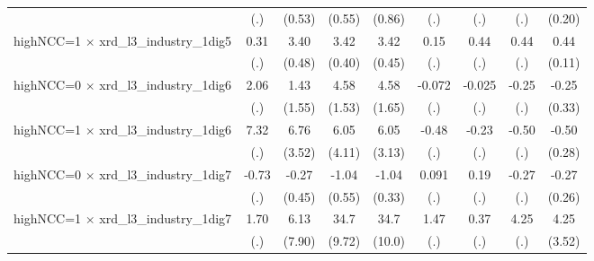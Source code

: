 {\begin{tabular}{l*{8}{c}}
                    &         (.)         &      (0.53)         &      (0.55)         &      (0.86)         &         (.)         &         (.)         &         (.)         &      (0.20)         \\
\addlinespace
highNCC=1 $\times$ xrd\_l3\_industry\_1dig5&        0.31         &        3.40\sym{***}&        3.42\sym{***}&        3.42\sym{***}&        0.15         &        0.44         &        0.44         &        0.44\sym{***}\\
                    &         (.)         &      (0.48)         &      (0.40)         &      (0.45)         &         (.)         &         (.)         &         (.)         &      (0.11)         \\
\addlinespace
highNCC=0 $\times$ xrd\_l3\_industry\_1dig6&        2.06         &        1.43         &        4.58\sym{***}&        4.58\sym{***}&      -0.072         &      -0.025         &       -0.25         &       -0.25         \\
                    &         (.)         &      (1.55)         &      (1.53)         &      (1.65)         &         (.)         &         (.)         &         (.)         &      (0.33)         \\
\addlinespace
highNCC=1 $\times$ xrd\_l3\_industry\_1dig6&        7.32         &        6.76\sym{*}  &        6.05         &        6.05\sym{*}  &       -0.48         &       -0.23         &       -0.50         &       -0.50\sym{*}  \\
                    &         (.)         &      (3.52)         &      (4.11)         &      (3.13)         &         (.)         &         (.)         &         (.)         &      (0.28)         \\
\addlinespace
highNCC=0 $\times$ xrd\_l3\_industry\_1dig7&       -0.73         &       -0.27         &       -1.04\sym{*}  &       -1.04\sym{***}&       0.091         &        0.19         &       -0.27         &       -0.27         \\
                    &         (.)         &      (0.45)         &      (0.55)         &      (0.33)         &         (.)         &         (.)         &         (.)         &      (0.26)         \\
\addlinespace
highNCC=1 $\times$ xrd\_l3\_industry\_1dig7&        1.70         &        6.13         &        34.7\sym{***}&        34.7\sym{***}&        1.47         &        0.37         &        4.25         &        4.25         \\
                    &         (.)         &      (7.90)         &      (9.72)         &      (10.0)         &         (.)         &         (.)         &         (.)         &      (3.52)         \\

\end{tabular}}
